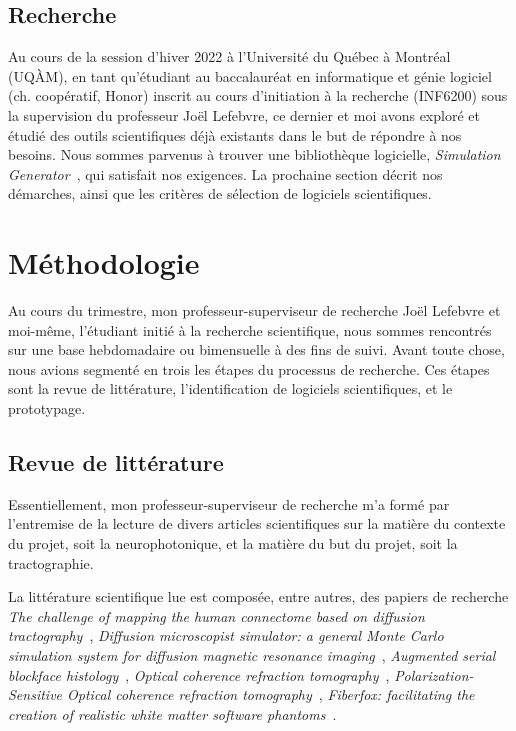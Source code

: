 \documentclass{article}
\begin{document}
  \subsection{Recherche}
  \label{subsec:research}
  Au cours de la session d'hiver 2022 à l'Université du Québec à Montréal (UQÀM), en tant qu'étudiant au baccalauréat en informatique et génie logiciel (ch.
  coopératif, Honor) inscrit au cours d'initiation à la recherche (INF6200) sous la supervision du professeur Joël Lefebvre, ce dernier et moi avons exploré et étudié
  des outils scientifiques déjà existants dans le but de répondre à nos besoins.
  Nous sommes parvenus à trouver une bibliothèque logicielle, \textit{Simulation Generator}~\cite{valcourtcaron2022simulationgenerator}, qui satisfait nos exigences.
  La prochaine section décrit nos démarches, ainsi que les critères de sélection de logiciels scientifiques.


  \section{Méthodologie}
  \label{sec:methodology}
  Au cours du trimestre, mon professeur-superviseur de recherche Joël Lefebvre et moi-même, l'étudiant initié à la recherche scientifique, nous sommes rencontrés sur
  une base hebdomadaire ou bimensuelle à des fins de suivi.
  Avant toute chose, nous avions segmenté en trois les étapes du processus de recherche.
  Ces étapes sont la revue de littérature, l'identification de logiciels scientifiques, et le prototypage.

  \subsection{Revue de littérature}
  \label{subsec:literature-review}

  Essentiellement, mon professeur-superviseur de recherche m'a formé par l'entremise de la lecture de divers articles scientifiques sur la matière du contexte du
  projet, soit la neurophotonique, et la matière du but du projet, soit la tractographie.

  La littérature scientifique lue est composée, entre autres, des papiers de recherche
  \textit{The challenge of mapping the human connectome based on diffusion tractography}~\cite{maierhein2017mappingconnectomedifftracto},
  \textit{Diffusion microscopist simulator: a general Monte Carlo simulation system for diffusion magnetic resonance imaging}~\cite{yeh2013diffmicrosim},
  \textit{Augmented serial blockface histology}~\cite{lefebvre2019augserialblockfacehist},
  \textit{Optical coherence refraction tomography}~\cite{zhou2019ocrt},
  \textit{Polarization-Sensitive Optical coherence refraction tomography}~\cite{lefebvre2021psocrt},
  \textit{Fiberfox: facilitating the creation of realistic white matter software phantoms}~\cite{neher2014fiberfox}.
\end{document}
